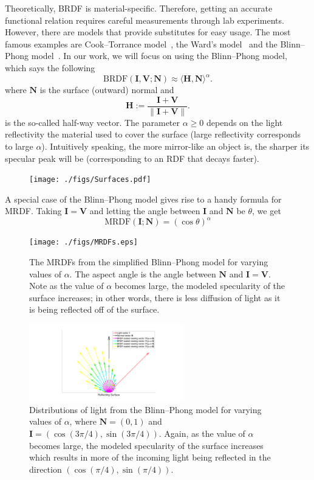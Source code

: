\documentclass[11pt,reqno]{amsart}
\newcommand{\BRDF}{\mathrm{BRDF}}
\newcommand{\MRDF}{\mathrm{MRDF}}
\newcommand{\ip}[2]{\langle {#1}, {#2} \rangle}
\theoremstyle{definition}
\begin{document}
Theoretically, BRDF is material-specific. Therefore, getting an accurate functional
relation requires careful measurements through lab experiments. However, there
are models that provide substitutes for easy usage. The most famous examples
are Cook--Torrance model~\cite{CookTorr}, the Ward's model~\cite{Ward} and the
Blinn--Phong model~\cite{BlinnPhong}. In our 
work, we will focus on using the
Blinn--Phong model, which says the following
\[
   \BRDF(\mathbf{I},\mathbf{V};\mathbf{N})
   \approx
   \ip{\mathbf{H}}{\mathbf{N}}^\alpha.
\]
where $\mathbf{N}$ is the surface (outward) normal and 
$$\mathbf{H}:=\frac{\mathbf{I}+\mathbf{V}} {\|\mathbf{I}+\mathbf{V}\|}.$$
is the so-called half-way vector. The parameter $\alpha \geq 0$ depends on the
light reflectivity the material used to cover the surface (large reflectivity
corresponds to large $\alpha$). Intuitively speaking, the more mirror-like an
object is,  the sharper its specular peak will be (corresponding to an RDF that
decays faster). 

\begin{figure}[H]
 \texttt{[image: ./figs/Surfaces.pdf]}
\end{figure}

A special case of the Blinn--Phong model gives rise to a handy formula for MRDF. Taking $\mathbf{I}=\mathbf{V}$ and letting the angle between $\mathbf{I}$ and $\mathbf{N}$ be $\theta$, we get
\[
\MRDF(\mathbf{I};\mathbf{N})=(\cos \theta)^\alpha
\]

\begin{figure}
 \texttt{[image: ./figs/MRDFs.eps]}
 \caption{The MRDFs from the simplified Blinn--Phong model for varying values of $\alpha$. The aspect angle is the angle between $\mathbf{N}$ and $\mathbf{I}=\mathbf{V}$. Note as the value of $\alpha$ becomes large, the modeled specularity of the surface increases; in other words, there is less diffusion of light as it is being reflected off of the surface.}
 \label{MRDFs}
\end{figure}

\begin{figure}
 \includegraphics[width=0.6\textwidth]{./figs/BRDF_Vectors.pdf}
 \caption{Distributions of light from the Blinn--Phong model for varying values of $\alpha$, where $\mathbf{N} = (0,1)$ and $\mathbf{I} = (\cos(3\pi/4),\sin(3\pi/4))$. Again, as the value of $\alpha$ becomes large, the modeled specularity of the surface increases which results in more of the incoming light being reflected in the direction $(\cos(\pi/4),\sin(\pi/4))$.}
 \label{BRDFVectors}
\end{figure}
\end{document}
